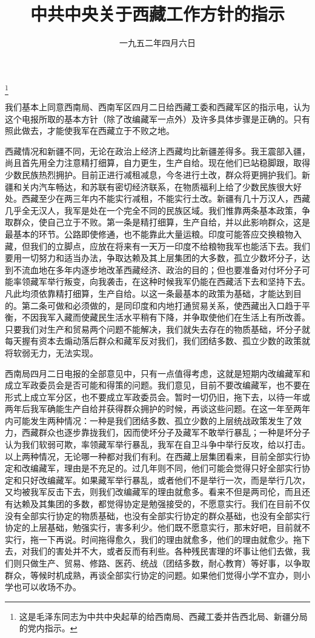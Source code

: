 
\title{中共中央关于西藏工作方针的指示}
\date{一九五二年四月六日}
\thanks{这是毛泽东同志为中共中央起草的给西南局、西藏工委并告西北局、新疆分局的党内指示。}
\maketitle


我们基本上同意西南局、西南军区四月二日给西藏工委和西藏军区的指示电，认为这个电报所取的基本方针（除了改编藏军一点外）及许多具体步骤是正确的。只有照此做去，才能使我军在西藏立于不败之地。

西藏情况和新疆不同，无论在政治上经济上西藏均比新疆差得多。我王震部入疆，尚且首先用全力注意精打细算，自力更生，生产自给。现在他们已站稳脚跟，取得少数民族热烈拥护。目前正进行减租减息，今冬进行土改，群众将更拥护我们。新疆和关内汽车畅达，和苏联有密切经济联系，在物质福利上给了少数民族很大好处。西藏至少在两三年内不能实行减租，不能实行土改。新疆有几十万汉人，西藏几乎全无汉人，我军是处在一个完全不同的民族区域。我们惟靠两条基本政策，争取群众，使自己立于不败。第一条是精打细算，生产自给，并以此影响群众，这是最基本的环节。公路即使修通，也不能靠此大量运粮。印度可能答应交换粮物入藏，但我们的立脚点，应放在将来有一天万一印度不给粮物我军也能活下去。我们要用一切努力和适当办法，争取达赖及其上层集团的大多数，孤立少数坏分子，达到不流血地在多年内逐步地改革西藏经济、政治的目的；但也要准备对付坏分子可能率领藏军举行叛变，向我袭击，在这种时候我军仍能在西藏活下去和坚持下去。凡此均须依靠精打细算，生产自给。以这一条最基本的政策为基础，才能达到目的。第二条可做和必须做的，是同印度和内地打通贸易关系，使西藏出入口趋于平衡，不因我军入藏而使藏民生活水平稍有下降，并争取使他们在生活上有所改善。只要我们对生产和贸易两个问题不能解决，我们就失去存在的物质基础，坏分子就每天握有资本去煽动落后群众和藏军反对我们，我们团结多数、孤立少数的政策就将软弱无力，无法实现。

西南局四月二日电报的全部意见中，只有一点值得考虑，这就是短期内改编藏军和成立军政委员会是否可能和得策的问题。我们意见，目前不要改编藏军，也不要在形式上成立军分区，也不要成立军政委员会。暂时一切仍旧，拖下去，以待一年或两年后我军确能生产自给并获得群众拥护的时候，再谈这些问题。在这一年至两年内可能发生两种情况：一种是我们团结多数、孤立少数的上层统战政策发生了效力，西藏群众也逐步靠拢我们，因而使坏分子及藏军不敢举行暴乱；一种是坏分子认为我们软弱可欺，率领藏军举行暴乱，我军在自卫斗争中举行反攻，给以打击。以上两种情况，无论哪一种都对我们有利。在西藏上层集团看来，目前全部实行协定和改编藏军，理由是不充足的。过几年则不同，他们可能会觉得只好全部实行协定和只好改编藏军。如果藏军举行暴乱，或者他们不是举行一次，而是举行几次，又均被我军反击下去，则我们改编藏军的理由就愈多。看来不但是两司伦，而且还有达赖及其集团的多数，都觉得协定是勉强接受的，不愿意实行。我们在目前不仅没有全部实行协定的物质基础，也没有全部实行协定的群众基础，也没有全部实行协定的上层基础，勉强实行，害多利少。他们既不愿意实行，那末好吧，目前就不实行，拖一下再说。时间拖得愈久，我们的理由就愈多，他们的理由就愈少。拖下去，对我们的害处并不大，或者反而有利些。各种残民害理的坏事让他们去做，我们则只做生产、贸易、修路、医药、统战（团结多数，耐心教育）等好事，以争取群众，等候时机成熟，再谈全部实行协定的问题。如果他们觉得小学不宜办，则小学也可以收场不办。

